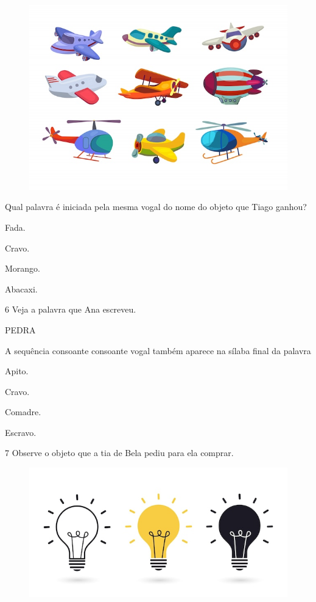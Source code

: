 \begin{figure}[htpb!]
\centering
\includegraphics[width=.5\textwidth]{media/image177.jpeg}
\end{figure}


Qual palavra é iniciada pela mesma vogal do nome do objeto que Tiago ganhou?

\begin{escolha}
\item Fada.

\item Cravo.

\item Morango.

\item Abacaxi.
\end{escolha}

\num{6} Veja a palavra que Ana escreveu.

\begin{myquote}
PEDRA
\end{myquote}

A sequência consoante consoante vogal também aparece na sílaba final da palavra

\begin{escolha}
\item Apito.

\item Cravo.

\item Comadre.

\item Escravo.
\end{escolha}

\num{7} Observe o objeto que a tia de Bela pediu para ela comprar.

\begin{figure}[htpb!]
\centering
\includegraphics[width=.5\textwidth]{media/image178.jpeg}
\end{figure}


